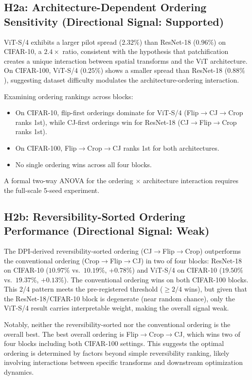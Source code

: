 \documentclass{article}
\begin{document}
\subsection{H2a: Architecture-Dependent Ordering Sensitivity (Directional Signal: Supported)}

ViT-S/4 exhibits a larger pilot spread ($2.32\%$) than ResNet-18 ($0.96\%$) on CIFAR-10, a $2.4\times$ ratio, consistent with the hypothesis that patchification creates a unique interaction between spatial transforms and the ViT architecture. On CIFAR-100, ViT-S/4 ($0.25\%$) shows a smaller spread than ResNet-18 ($0.88\%$), suggesting dataset difficulty modulates the architecture-ordering interaction.

Examining ordering rankings across blocks:
\begin{itemize}
\item On CIFAR-10, flip-first orderings dominate for ViT-S/4 (Flip$\to$CJ$\to$Crop ranks 1st), while CJ-first orderings win for ResNet-18 (CJ$\to$Flip$\to$Crop ranks 1st).
\item On CIFAR-100, Flip$\to$Crop$\to$CJ ranks 1st for both architectures.
\item No single ordering wins across all four blocks.
\end{itemize}

A formal two-way ANOVA for the ordering $\times$ architecture interaction requires the full-scale 5-seed experiment.

\subsection{H2b: Reversibility-Sorted Ordering Performance (Directional Signal: Weak)}

The DPI-derived reversibility-sorted ordering (CJ$\to$Flip$\to$Crop) outperforms the conventional ordering (Crop$\to$Flip$\to$CJ) in two of four blocks: ResNet-18 on CIFAR-10 ($10.97\%$ vs.\ $10.19\%$, $+0.78\%$) and ViT-S/4 on CIFAR-10 ($19.50\%$ vs.\ $19.37\%$, $+0.13\%$). The conventional ordering wins on both CIFAR-100 blocks. This 2/4 pattern meets the pre-registered threshold ($\geq 2/4$ wins), but given that the ResNet-18/CIFAR-10 block is degenerate (near random chance), only the ViT-S/4 result carries interpretable weight, making the overall signal weak.

Notably, neither the reversibility-sorted nor the conventional ordering is the overall best. The best overall ordering is Flip$\to$Crop$\to$CJ, which wins two of four blocks including both CIFAR-100 settings. This suggests the optimal ordering is determined by factors beyond simple reversibility ranking, likely involving interactions between specific transforms and downstream optimization dynamics.
\end{document}
